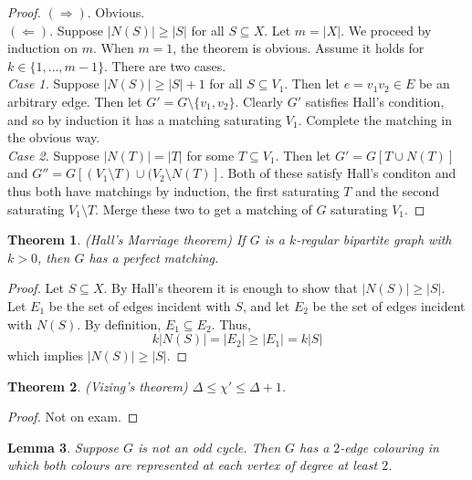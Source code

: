 \documentclass[12pt]{amsart}
\newtheorem{thm}{Theorem}
\newtheorem{lem}[thm]{Lemma}
\theoremstyle{definition}
\begin{document}
\begin{proof}
$(\Rightarrow).$ Obvious.\\

$(\Leftarrow).$ Suppose $|N(S)| \geq |S|$ for all $S \subseteq X$.
Let $m = |X|$. We proceed by induction on $m$. When $m=1$, the theorem is obvious. Assume it holds
for $k \in \{1,\ldots,m-1\}$.  There are two cases.\\

\emph{Case 1.} Suppose $|N(S)| \geq |S|+1$ for all $S \subseteq V_1$. Then let $e = v_1 v_2 \in E$ be an 
arbitrary edge. Then let $G' = G \setminus \{v_1,v_2\}$. Clearly $G'$ satisfies Hall's condition, and so
by induction it has a matching saturating $V_1$. Complete the matching in the obvious way.\\

\emph{Case 2.} Suppose $|N(T)| = |T|$ for some $T \subseteq V_1$. Then let 
$G' = G[T \cup N(T)]$ and $G'' = G[(V_1 \setminus T) \cup (V_2 \setminus N(T)]$. Both of these satisfy Hall's conditon
and thus both have matchings by induction, the first saturating $T$ and the second saturating $V_1 \setminus T$. 
Merge these two to get a matching of $G$ saturating $V_1$.

\end{proof}

\begin{thm} (Hall's Marriage theorem)
If $G$ is a $k$-regular bipartite graph with $k > 0$, then $G$ has a perfect matching.
\end{thm}

\begin{proof}
Let $S \subseteq X$. By Hall's theorem it is enough to show that 
$|N(S)| \geq |S|$. Let $E_1$ be the set of edges incident with $S$, and let 
$E_2$ be the set of edges incident with $N(S)$. By definition,
$E_1 \subseteq E_2$. Thus, $$k |N(S)| = |E_2| \geq |E_1| = k|S|$$ which implies $|N(S)| \geq |S|$.
\end{proof}

\begin{thm} (Vizing's theorem)
$\Delta \leq \chi' \leq \Delta+1$.
\end{thm}

\begin{proof}
Not on exam.
\end{proof}

\begin{lem}
Suppose $G$ is not an odd cycle. Then $G$ has a $2$-edge colouring in which both colours are 
represented at each vertex of degree at least $2$.
\end{lem}
\end{document}
